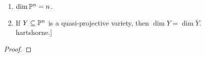 \label{1.2.7}

\begin{enumerate}[label = (\alph*)]
    \item $\dim \P^n = n$.
    
    \item If $Y \subseteq \P^n$ is a quasi-projective variety, then $\dim Y = \dim \overline{Y}$.\\
    [\textit{Hint}: Use (Ex. \ref{1.2.6}) to reduce to \cite[1.10]{hartshorne}.]
\end{enumerate}

\begin{proof}
    
\end{proof}
